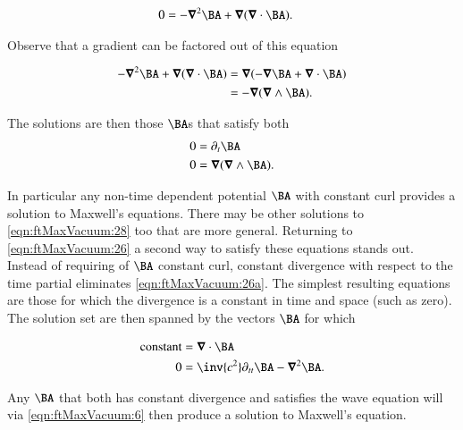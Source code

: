 \begin{align}
\label{eqn:ftMaxVacuum:28}
0
&= - \spacegrad^2 \BA + \spacegrad (\spacegrad \cdot \BA ).
\end{align}

Observe that a gradient can be factored out of this equation

\begin{align*}
- \spacegrad^2 \BA + \spacegrad (\spacegrad \cdot \BA )
&=
\spacegrad (-\spacegrad \BA + \spacegrad \cdot \BA ) \\
&=
-\spacegrad (\spacegrad \wedge \BA).
\end{align*}

The solutions are then those $\BA$s that satisfy both
\begin{subequations}
\label{eqn:ftMaxVacuum:28b}
\begin{align}
0 &= \partial_t \BA \\
0 &= \spacegrad (\spacegrad \wedge \BA).
\end{align}
\end{subequations}

In particular any non-time dependent potential $\BA$ with constant curl provides a solution to Maxwell's equations.  There may be other solutions to \autoref{eqn:ftMaxVacuum:28} too that are more general.  Returning to \autoref{eqn:ftMaxVacuum:26} a second way to satisfy these equations stands out.  Instead of requiring of $\BA$ constant curl, constant divergence with respect to the time partial eliminates \autoref{eqn:ftMaxVacuum:26a}.  The simplest resulting equations are those for which the divergence is a constant in time and space (such as zero).  The solution set are then spanned by the vectors $\BA$ for which

\begin{subequations}
\label{eqn:ftMaxVacuum:29}
\begin{align}
\text{constant} &= \spacegrad \cdot \BA 
\label{eqn:ftMaxVacuum:29a}
\\
0 &= \inv{c^2} \partial_{tt} \BA - \spacegrad^2 \BA.
\label{eqn:ftMaxVacuum:29b}
\end{align}
\end{subequations}

Any $\BA$ that both has constant divergence and satisfies the wave equation will via \autoref{eqn:ftMaxVacuum:6} then produce a solution to Maxwell's equation.


